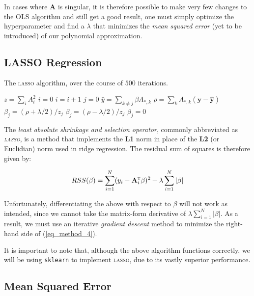 \documentclass[a4paper,10pt,english]{article}
\begin{document}
\begin{multicols*}{2}
In cases where $\mathbf{A}$ is singular, it is therefore possible to make very few changes to the OLS algorithm and still get a good result, one must simply optimize the hyperparameter and find a $\lambda$ that minimizes the \textit{mean squared error} (yet to be introduced) of our polynomial approximation.

\subsection*{LASSO Regression}

\begin{algorithm}[H]
	\caption{The \textsc{lasso} algorithm, over the course of $500$ iterations.}
	\begin{algorithmic}[1]
		\State $z = \sum_i A_i^2$
		\State $i = 0$
		\State $i = i + 1$
		\State $j = 0$
		\State $\hat{y} = \sum_{k \neq j} \beta A_{*,k}$
		\State $\rho = \sum_k A_{*,k} (\mathbf{y} - \mathbf{\hat{y}})$
		\State $\beta_j = (\rho + \lambda/2)/z_j$
		\State $\beta_j = (\rho - \lambda/2)/z_j$
		\Else
		\State $\beta_j = 0$
		\EndIf
		\EndWhile		
		\EndWhile
	\end{algorithmic}
\end{algorithm}


The \textit{least absolute shrinkage and selection operator}, commonly abbreviated as \textit{\textsc{lasso}}, is a method that implements the \textbf{L1} norm in place of the \textbf{L2} (or Euclidian) norm used in ridge regression.  The residual sum of squares is therefore given by:

\begin{equation}
\label{eq_method_4}
RSS(\beta) = \sum_{i=1}^N (y_i - \mathbf{A}_i^\textsc{t} \beta)^2 + \lambda \sum_{i=1}^N |\beta|
\end{equation}

Unfortunately, differentiating the above with respect to $\beta$ will not work as intended, since we cannot take the matrix-form derivative of $\lambda \sum_{i=1}^N |\beta|$.  As a result, we must use an iterative \textit{gradient descent} method to minimize the right-hand side of (\ref{eq_method_4}).

It is important to note that, although the above algorithm functions correctly, we will be using \texttt{sklearn} to implement \textsc{lasso}, due to its vastly superior performance.

\subsection*{Mean Squared Error}


\end{multicols*}
\end{document}
